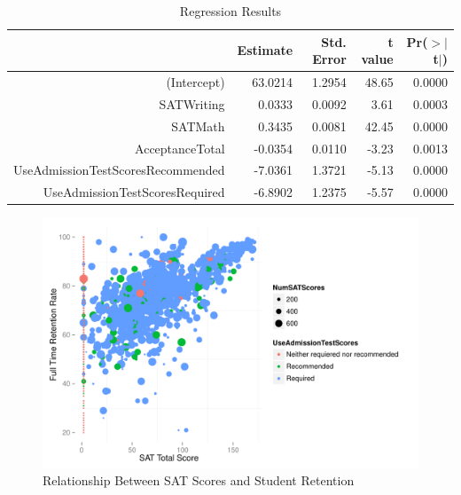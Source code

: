\documentclass[letterpaper,doc]{apa6}
\begin{document}
\begin{table}[ht]
\begin{center}
\begin{tabular}{rrrrr}
  \hline
 & Estimate & Std. Error & t value & Pr($>$$|$t$|$) \\ 
  \hline
(Intercept) & 63.0214 & 1.2954 & 48.65 & 0.0000 \\ 
  SATWriting & 0.0333 & 0.0092 & 3.61 & 0.0003 \\ 
  SATMath & 0.3435 & 0.0081 & 42.45 & 0.0000 \\ 
  AcceptanceTotal & -0.0354 & 0.0110 & -3.23 & 0.0013 \\ 
  UseAdmissionTestScoresRecommended & -7.0361 & 1.3721 & -5.13 & 0.0000 \\ 
  UseAdmissionTestScoresRequired & -6.8902 & 1.2375 & -5.57 & 0.0000 \\ 
   \hline
\end{tabular}
\caption{Regression Results}
\label{regressionTable}
\end{center}
\end{table}
\begin{figure}
\centering
\includegraphics{Retention-003}
\caption{Relationship Between SAT Scores and Student Retention}
\label{fig:sat}
\end{figure}






\end{document}
